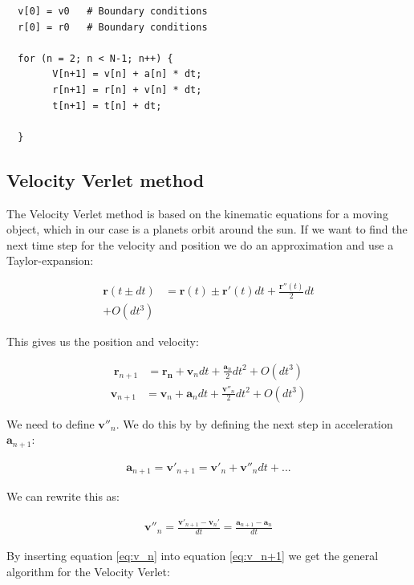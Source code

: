 \documentclass{article}
\begin{document}
\begin{verbatim}
  v[0] = v0   # Boundary conditions
  r[0] = r0   # Boundary conditions

  for (n = 2; n < N-1; n++) {
        V[n+1] = v[n] + a[n] * dt;
        r[n+1] = r[n] + v[n] * dt;
        t[n+1] = t[n] + dt;
       
  }
\end{verbatim}

\subsection{Velocity Verlet method}
The Velocity Verlet method is based on the kinematic equations for a moving object, which in our case is a planets orbit around the sun. If we want to find the next time step for the velocity and position we do an approximation and use a Taylor-expansion:    

\begin{align*}
\mathbf{r}(t\pm dt)&=\mathbf{r}(t)\pm \mathbf{r}'(t)dt + \frac{\mathbf{r}''(t)}{2}dt\\ + O(dt^3)
\end{align*}

This gives us the position and velocity:

\begin{align}
    \mathbf{r}_{n+1}&=\mathbf{r_n}+\mathbf{v}_n dt + \frac{\mathbf{a}_n}{2}dt^2+O(dt^3)
    \label{eq:r_n+1}
    \end{align}
    \begin{align}
    \mathbf{v}_{n+1}&=\mathbf{v}_n+\mathbf{a}_ndt+\frac{\mathbf{v}''_n}{2}dt^2 + O(dt^3)
     \label{eq:v_n+1}
\end{align}

We need to define $\mathbf{v}''_n$. We do this by by defining the next step in acceleration $\mathbf{a}_{n+1}$:

\begin{align*}
    \mathbf{a}_{n+1}=\mathbf{v}'_{n+1}=\mathbf{v}'_n+\mathbf{v}''_ndt + ...
\end{align*}

We can rewrite this as:

\begin{align}
        \mathbf{v}''_n=\frac{\mathbf{v}'_{n+1}-\mathbf{v}_n'}{dt}
    =\frac{\mathbf{a}_{n+1}-\mathbf{a}_n}{dt}
    \label{eq:v_n}
\end{align}

By inserting equation \ref{eq:v_n} into equation \ref{eq:v_n+1} we get the general algorithm for the Velocity Verlet:
\end{document}
